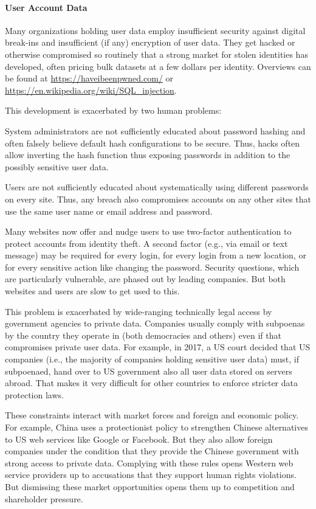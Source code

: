 \paragraph{User Account Data}
Many organizations holding user data employ insufficient security against digital break-ins and insufficient (if any) encryption of user data.
They get hacked or otherwise compromised so routinely that a strong market for stolen identities has developed, often pricing bulk datasets at a few dollars per identity.
Overviews can be found at \url{https://haveibeenpwned.com/} or \url{https://en.wikipedia.org/wiki/SQL_injection}.

This development is exacerbated by two human problems:
\begin{compactitem}
 \item System administrators are not sufficiently educated about password hashing and often falsely believe default hash configurations to be secure.
 Thus, hacks often allow inverting the hash function thus exposing passwords in addition to the possibly sensitive user data.
 \item Users are not sufficiently educated about systematically using different passwords on every site.
 Thus, any breach also compromises accounts on any other sites that use the same user name or email address and password.
\end{compactitem}

Many websites now offer and nudge users to use two-factor authentication to protect accounts from identity theft.
A second factor (e.g., via email or text message) may be required for every login, for every login from a new location, or for every sensitive action like changing the password.
Security questions, which are particularly vulnerable, are phased out by leading companies.
But both websites and users are slow to get used to this.
\medskip

This problem is exacerbated by wide-ranging technically legal access by government agencies to private data.
Companies usually comply with subpoenas by the country they operate in (both democracies and others) even if that compromises private user data.
For example, in 2017, a US court decided that US companies (i.e., the majority of companies holding sensitive user data) must, if subpoenaed, hand over to US government also all user data stored on servers abroad.
That makes it very difficult for other countries to enforce stricter data protection laws.

These constraints interact with market forces and foreign and economic policy.
For example, China uses a protectionist policy to strengthen Chinese alternatives to US web services like Google or Facebook.
But they also allow foreign companies under the condition that they provide the Chinese government with strong access to private data.
Complying with these rules opens Western web service providers up to accusations that they support human rights violations.
But dismissing these market opportunities opens them up to competition and shareholder pressure.
\medskip

